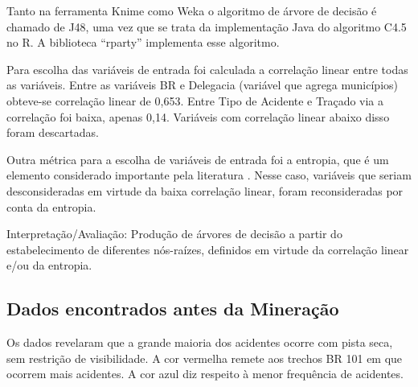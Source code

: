 Tanto na ferramenta Knime como Weka o algoritmo de árvore de decisão é chamado de J48,
uma vez que se trata da implementação Java do algoritmo
C4.5 no R. A biblioteca “rparty” implementa esse algoritmo.

Para escolha das variáveis de entrada foi calculada a correlação linear entre todas as variáveis. Entre as variáveis BR e
Delegacia (variável que agrega municípios) obteve-se correlação linear de 0,653. Entre Tipo de Acidente e Traçado via a
correlação foi baixa, apenas 0,14. Variáveis com correlação linear abaixo disso foram descartadas. 

Outra métrica para a escolha de variáveis de entrada foi a entropia, que é um elemento considerado importante pela literatura \cite{NorvigRussel2004}. Nesse caso, variáveis que seriam desconsideradas em virtude da baixa correlação linear, foram reconsideradas por conta da entropia.

Interpretação/Avaliação: Produção de árvores de decisão a
partir do estabelecimento de diferentes nós-raízes, definidos em
virtude da correlação linear e/ou da entropia.


\subsection{Dados encontrados antes da Mineração}

Os dados revelaram que a grande maioria dos acidentes ocorre com pista seca, sem restrição de visibilidade. 
A cor vermelha remete aos trechos BR 101 em que ocorrem mais acidentes. A cor azul diz respeito à menor frequência de acidentes.

